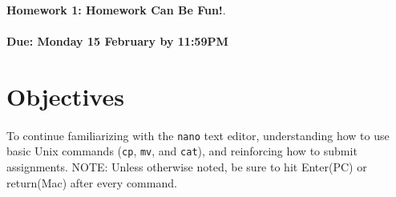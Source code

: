 \documentclass[letter,11pt]{article}
\begin{document}
\huge
\textbf{Homework 1: Homework Can Be Fun!}.
\normalsize
\\ ~~ \\
\textbf{Due: Monday 15 February by 11:59PM}

\section*{Objectives}
\paragraph{}To continue familiarizing with the \texttt{nano} text editor, understanding how to use basic Unix commands (\texttt{cp}, \texttt{mv}, and \texttt{cat}), and reinforcing how to submit assignments. NOTE: Unless otherwise noted, be sure to hit Enter(PC) or return(Mac) after every command.
\end{document}
